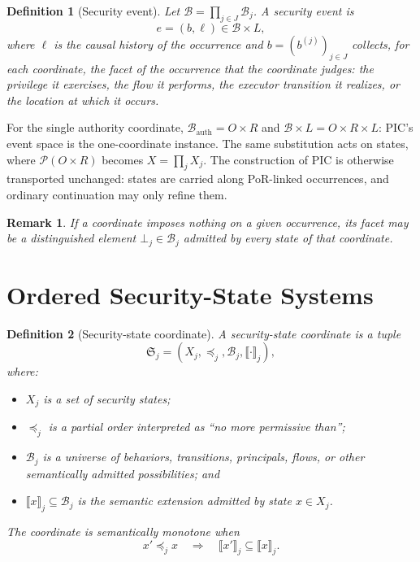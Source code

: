 \documentclass[10pt,twocolumn]{article}
\newcommand{\sem}[1]{\llbracket #1 \rrbracket}
\newcommand{\powerset}{\mathcal{P}}
\newtheorem{definition}{Definition}
\newtheorem{remark}{Remark}
\begin{document}
\begin{definition}[Security event]\label{def:event}
Let $\mathcal{B}=\prod_{j\in J}\mathcal{B}_j$. A security event is
\begin{equation}
  e=(b,\ell)\in\mathcal{B}\times L,
\end{equation}
where $\ell$ is the causal history of the occurrence and
$b=(b^{(j)})_{j\in J}$ collects, for each coordinate, the facet of the
occurrence that the coordinate judges: the privilege it exercises, the
flow it performs, the executor transition it realizes, or the location at
which it occurs.
\end{definition}

For the single authority coordinate, $\mathcal{B}_{\mathrm{auth}}=O\times
R$ and $\mathcal{B}\times L=O\times R\times L$: PIC's event space is the
one-coordinate instance. The same substitution acts on states, where
$\powerset(O\times R)$ becomes $X=\prod_j X_j$. The construction of PIC
is otherwise transported unchanged: states are carried along PoR-linked
occurrences, and ordinary continuation may only refine them.

\begin{remark}
If a coordinate imposes nothing on a given occurrence, its facet may be
a distinguished element $\bot_j\in\mathcal{B}_j$ admitted by every state
of that coordinate.
\end{remark}

\section{Ordered Security-State Systems}

\begin{definition}[Security-state coordinate]\label{def:coordinate}
A security-state coordinate is a tuple
\begin{equation}
  \mathfrak{S}_j=(X_j,\preceq_j,\mathcal{B}_j,\sem{\cdot}_j),
\end{equation}
where:
\begin{itemize}[leftmargin=*]
  \item $X_j$ is a set of security states;
  \item $\preceq_j$ is a partial order interpreted as ``no more permissive
        than'';
  \item $\mathcal{B}_j$ is a universe of behaviors, transitions, principals,
        flows, or other semantically admitted possibilities; and
  \item $\sem{x}_j\subseteq\mathcal{B}_j$ is the semantic extension admitted
        by state $x\in X_j$.
\end{itemize}
The coordinate is \emph{semantically monotone} when
\begin{equation}
  x'\preceq_j x
  \quad\Longrightarrow\quad
  \sem{x'}_j\subseteq\sem{x}_j.
  \label{eq:semantic-monotonicity}
\end{equation}
\end{definition}
\end{document}
